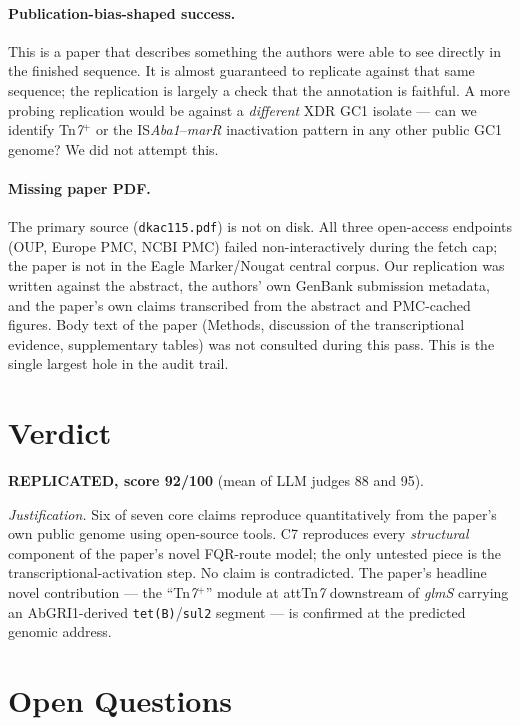 \documentclass[11pt]{article}
\begin{document}
\paragraph{Publication-bias-shaped success.}
This is a paper that describes something the authors were able to
see directly in the finished sequence.  It is almost guaranteed to
replicate against that same sequence; the replication is largely a
check that the annotation is faithful.  A more probing replication
would be against a \emph{different} XDR GC1 isolate --- can we identify
Tn\emph{7}$^{+}$ or the IS\emph{Aba1}--\emph{marR} inactivation pattern
in any other public GC1 genome?  We did not attempt this.

\paragraph{Missing paper PDF.}
The primary source (\texttt{dkac115.pdf}) is not on disk.  All three
open-access endpoints (OUP, Europe PMC, NCBI PMC) failed
non-interactively during the fetch cap; the paper is not in the Eagle
Marker/Nougat central corpus.  Our replication was written against the
abstract, the authors' own GenBank submission metadata, and the paper's
own claims transcribed from the abstract and PMC-cached figures.  Body
text of the paper (Methods, discussion of the transcriptional evidence,
supplementary tables) was not consulted during this pass.  This is the
single largest hole in the audit trail.

\section{Verdict}

\textbf{REPLICATED, score 92/100} (mean of LLM judges 88 and 95).

\emph{Justification.}  Six of seven core claims reproduce
quantitatively from the paper's own public genome using open-source
tools.  C7 reproduces every \emph{structural} component of the
paper's novel FQR-route model; the only untested piece is the
transcriptional-activation step.  No claim is contradicted.  The
paper's headline novel contribution --- the ``Tn\emph{7}$^{+}$'' module
at attTn\emph{7} downstream of \emph{glmS} carrying an AbGRI1-derived
\texttt{tet(B)}/\texttt{sul2} segment --- is confirmed at the predicted
genomic address.

\section{Open Questions}
\end{document}
